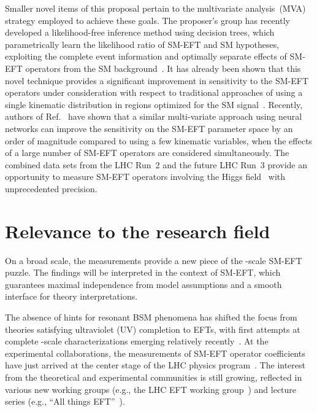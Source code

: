 \documentclass[a4paper,11pt]{article}
\begin{document}
Smaller novel items of this proposal pertain to the multivariate analysis~(MVA) strategy employed to achieve these goals. 
The proposer's group has recently developed a likelihood-free inference method using decision trees, which parametrically learn the likelihood ratio of SM-EFT and SM hypotheses, exploiting the complete event information and optimally separate effects of SM-EFT operators from the SM background~\cite{Chatterjee:2021nms,Chatterjee:2022oco}. It has already been shown that this novel technique provides a significant improvement in sensitivity to the SM-EFT operators under consideration with respect to traditional approaches of using a single kinematic distribution in regions optimized for the SM signal~\cite{Chatterjee:2022oco}.
Recently, authors of Ref.~\cite{GomezAmbrosio:2022mpm} have shown that a similar multi-variate approach using neural networks can improve the sensitivity on the SM-EFT parameter space by an order of magnitude compared to using a few kinematic variables, when the effects of a large number of SM-EFT operators are considered simultaneously.
The combined data sets from the LHC Run~2 and the future LHC Run~3 provide an opportunity to measure SM-EFT operators involving the Higgs field~\cite{Elias-Miro:2013mua,Gupta:2014rxa} with unprecedented precision.

\section{Relevance to the research field}
\label{sec:relevance}

On a broad scale, the measurements provide a new piece of the {\TeV}-scale SM-EFT puzzle. 
The findings will be interpreted in the context of SM-EFT, which guarantees maximal independence from model assumptions and a smooth interface for theory interpretations.  

The absence of hints for resonant BSM phenomena has shifted the focus from theories satisfying ultraviolet (UV) completion to EFTs, with first attempts at complete {\TeV}-scale characterizations emerging relatively recently~\cite{Ellis:2018gqa,Ellis:2020unq,Ethier:2021bye}.
At the experimental collaborations, the measurements of SM-EFT operator coefficients have just arrived at the center stage of the LHC physics program~\cite{CMS:2021nnc,CMS:2021aly,CMS:2021gme}.
The interest from the theoretical and experimental communities is still growing, reflected in various new working groups (e.g., the  LHC EFT working group~\cite{LHC_EFT_WG}) and lecture series (e.g., ``All things EFT''~\cite{All_EFT}).
\end{document}
